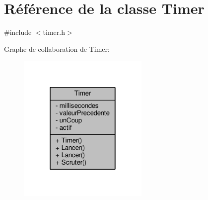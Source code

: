 \hypertarget{class_timer}{}\section{Référence de la classe Timer}
\label{class_timer}


{\ttfamily \#include $<$timer.\+h$>$}



Graphe de collaboration de Timer\+:\nopagebreak
\begin{figure}[H]
\begin{center}
\leavevmode
\includegraphics[width=178pt]{class_timer__coll__graph}
\end{center}
\end{figure}
